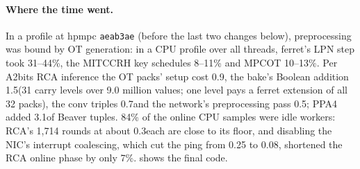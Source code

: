\paragraph{Where the time went.} In a profile at hpmpc \texttt{aeab3ae} (before the last two changes below), preprocessing
was bound by OT generation: in a CPU profile over all threads, ferret's LPN step took 31--44\%, the MITCCRH key
schedules 8--11\% and MPCOT 10--13\%. Per A2bits RCA inference the OT packs' setup cost 0.9\s, the bake's Boolean
addition 1.5\s (31 carry levels over 9.0 million values; one level pays a ferret extension of all 32 packs), the conv
triples 0.7\s and the network's preprocessing pass 0.5\s; PPA4 added 3.1\s of Beaver tuples. 84\% of the online CPU
samples were idle workers: RCA's 1,714 rounds at about 0.3\ms each are close to its floor, and disabling the NIC's
interrupt coalescing, which cut the ping from 0.25 to 0.08\ms, shortened the RCA online phase by only 7\%.
 shows the final code.

